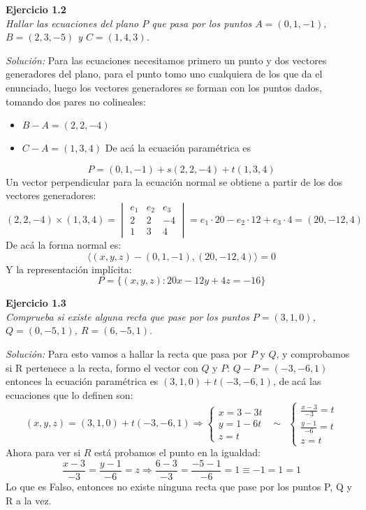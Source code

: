 \documentclass{article}
\newenvironment{problem}[2][Ejercicio]
    { \begin{mdframed}[backgroundcolor=gray!20] \textbf{#1 #2} \\}
    {  \end{mdframed}}
\newenvironment{solution}
    {\textit{Solución:}}
    {}
\begin{document}
    \begin{problem}{1.2}
    \emph{Hallar las ecuaciones del plano $P$ que pasa por los puntos $A=(0,1,-1),$ $B=(2,3,-5)$ y $C=(1,4,3)$.}
    \end{problem}
    \begin{solution}
    Para las ecuaciones necesitamos primero un punto y dos vectores generadores del plano, para el punto tomo uno cualquiera de los que da el enunciado, luego los vectores generadores se forman con los puntos dados, tomando dos pares no colineales:
    \begin{itemize}
    \item 
    $B-A = (2,2,-4)$
    \item 
    $C-A=(1,3,4)$
    De acá la ecuación paramétrica es
    \end{itemize}
    \[
    P = (0,1,-1) + s (2,2,-4)+ t(1,3,4)
    \]
    Un vector perpendicular para la ecuación normal se obtiene a partir de los dos vectores generadores:
    \[
    (2,2,-4) \times (1,3,4) = 
    \begin{vmatrix}
    e_1 & e_2 & e_3 \\
    2 & 2 & -4 \\
    1 & 3 & 4
    \end{vmatrix} = e_1\cdot 20 - e_2 \cdot12+e_3\cdot 4 = (20,-12,4)
    \]
    De acá la forma normal es:
    \[
    \langle (x,y,z) - (0,1,-1), (20,-12,4) \rangle = 0
    \]
    Y la representación implícita:
    \[
    P = \{ (x,y,z) : 20x-12y+4z = -16 \}
    \]
    \end{solution}
    
    \begin{problem}{1.3}
    \emph{Comprueba si existe alguna recta que pase por los puntos $P=(3,1,0)$, $Q=(0,-5,1)$, $R=(6,-5,1)$}.
    \end{problem}
    \begin{solution}
    Para esto vamos a hallar la recta que pasa por $P$ y $Q$, y comprobamos si R pertenece a la recta, formo el vector con $Q$ y $P$: $Q-P=(-3,-6,1)$ entonces la ecuación paramétrica es $(3,1,0) + t(-3,-6,1)$, de acá las ecuaciones que lo definen son:
    \[
    (x,y,z) = (3,1,0) + t(-3,-6,1) \Rightarrow 
    \begin{cases}
    x = 3-3t \\
    y = 1-6t \\
    z = t
    \end{cases} \ \  \sim \ \ 
    \begin{cases}
    \frac{x-3}{-3} = t \\
    \frac{y-1}{-6} = t \\
    z = t
    \end{cases}
    \]
    Ahora para ver si $R$ está probamos el punto en la igualdad:
    \[
    \frac{x-3}{-3} = \frac{y-1}{-6} = z \Rightarrow \frac{6-3}{-3} = \frac{-5-1}{-6} = 1 \equiv -1 = 1 = 1
    \]
    Lo que es Falso, entonces no existe ninguna recta que pase por los puntos P, Q y R a la vez.
    \end{solution}
    
\end{document}
